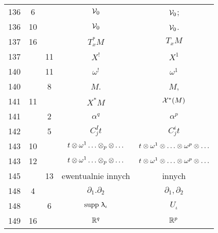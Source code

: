 \documentclass[a4paper,11pt]{article}
\begin{document}
\begin{center}
\begin{tabular}{|c|c|c|c|c|}
    136 &  6 & & $\mathcal{V}_{ 0 }$ & $\mathcal{V}_{ 0 }$; \\
    136 & 10 & & $\mathcal{V}_{ 0 }$ & $\mathcal{V}_{ 0 }$. \\
    137 & 16 & & $T^{ * }_{ x }M$ & $T_{ x }M$ \\
    137 & & 11 & $X^{ ! }$ & $X^{ 1 }$ \\
    140 & & 11 & $\omega^{ ! }$ & $\omega^{ 1 }$ \\
    140 & &  8 & $M$. & $M$, \\
    141 & 11 & & $X^{ * } M$ & $\mathcal{X}^{ * }( M )$ \\
    141 & &  2 & $\alpha^{ q }$ & $\alpha^{ p }$ \\
    142 & &  5 & $C^{ I }_{ j } t$ & $C^{ i }_{ j } t$ \\
    143 & 10 & & $t \otimes \omega^{ 1 } \ldots \otimes_{ p } \otimes \ldots$
           & $t \otimes \omega^{ 1 } \otimes \ldots \otimes \omega^{ p } \otimes \ldots$ \\
    143 & 12 & & $t \otimes \omega^{ 1 } \ldots \otimes_{ p } \otimes \ldots$
           & $t \otimes \omega^{ 1 } \otimes \ldots \otimes \omega^{ p } \otimes \ldots$ \\
    145 & & 13 & ewentualnie innych & innych \\
    148 &  4 & & $\partial_{ 1 }.\partial_{ 2 }$ & $\partial_{ 1 }, \partial_{ 2 }$ \\
    148 & &  6 & $\mathrm{supp}\,\, \uplambda_{ \iota }$ & $U_{ \iota }$ \\
    149 & 16 & & $\mathbb{R}^{ q }$ & $\mathbb{R}^{ p }$ \\
    \hline
  \end{tabular}


\end{center}
\end{document}
